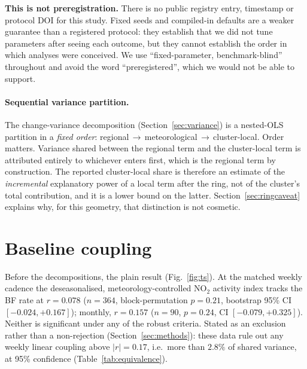 \documentclass[11pt,a4paper]{article}
\newcommand{\rval}[1]{\mbox{$r=#1$}}
\providecommand{\ce}[1]{\ensuremath{\mathrm{#1}}}
\begin{document}
\textbf{This is not preregistration.} There is no public registry entry, timestamp or protocol
DOI for this study. Fixed seeds and compiled-in defaults are a weaker guarantee than a registered
protocol: they establish that we did not tune parameters after seeing each outcome, but they
cannot establish the order in which analyses were conceived. We use ``fixed-parameter,
benchmark-blind'' throughout and avoid the word ``preregistered'', which we would not be able to
support.

\paragraph{Sequential variance partition.} The change-variance decomposition
(Section~\ref{sec:variance}) is a nested-OLS partition in a \emph{fixed order}:
regional\,$\to$\,meteorological\,$\to$\,cluster-local. Order matters. Variance shared between the
regional term and the cluster-local term is attributed entirely to whichever enters first, which
is the regional term by construction. The reported cluster-local share is therefore an estimate
of the \emph{incremental} explanatory power of a local term after the ring, not of the cluster's
total contribution, and it is a lower bound on the latter. Section~\ref{sec:ringcaveat} explains
why, for this geometry, that distinction is not cosmetic.

\section{Baseline coupling}
\label{sec:baseline}

Before the decompositions, the plain result (Fig.~\ref{fig:ts}). At the matched weekly cadence
the deseasonalised, meteorology-controlled \ce{NO_2} activity index tracks the BF rate at
\rval{0.078} ($n=364$, block-permutation $p=0.21$, bootstrap 95\% CI $[-0.024,+0.167]$);
monthly, \rval{0.157} ($n=90$, $p=0.24$, CI $[-0.079,+0.325]$). Neither is significant under any
of the robust criteria. Stated as an exclusion rather than a non-rejection
(Section~\ref{sec:methods}): these data rule out any weekly linear coupling above $|r|=0.17$,
i.e.\ more than $2.8\%$ of shared variance, at 95\% confidence
(Table~\ref{tab:equivalence}).
\end{document}
